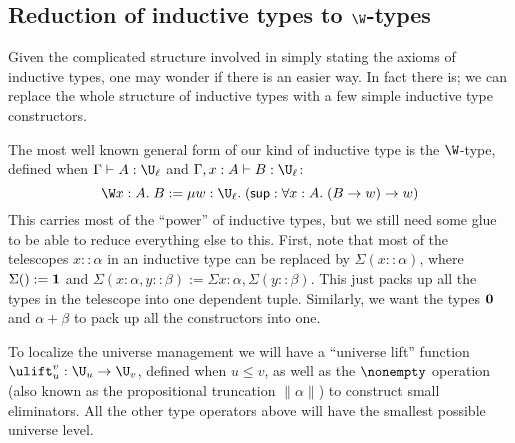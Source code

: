 \subsection{Reduction of inductive types to $\W$-types}

Given the complicated structure involved in simply stating the axioms of inductive types, one may wonder if there is an easier way. In fact there is; we can replace the whole structure of inductive types with a few simple inductive type constructors.

The most well known general form of our kind of inductive type is the $\W$-type, defined when $\Gamma\vdash A:\U_\ell$ and $\Gamma,x:A\vdash B:\U_\ell$:
$$\W x:A.\;B:=\mu w:\U_\ell.\;(\mathsf{sup}:\forall x:A.\;(B\to w)\to w)$$
This carries most of the ``power'' of inductive types, but we still need some glue to be able to reduce everything else to this. First, note that most of the telescopes $x::\alpha$ in an inductive type can be replaced by $\Sigma(x::\alpha)$, where $\Sigma ():=\bf 1$ and $\Sigma (x:\alpha,y::\beta):=\Sigma x:\alpha,\Sigma(y::\beta)$. This just packs up all the types in the telescope into one dependent tuple. Similarly, we want the types $\bf 0$ and $\alpha+\beta$ to pack up all the constructors into one.

To localize the universe management we will have a ``universe lift'' function $\ulift_u^v:\U_u\to\U_v$, defined when $u\le v$, as well as the $\nonempty$ operation (also known as the propositional truncation $\|\alpha\|$) to construct small eliminators. All the other type operators above will have the smallest possible universe level.

